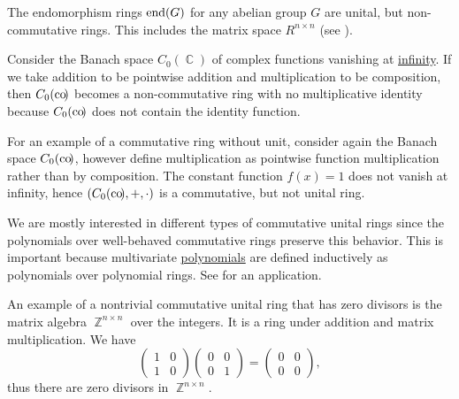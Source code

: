 \begin{example}
\begin{refenum}
     The endomorphism rings \( \operatorname{end}(G) \) for any abelian group \( G \) are unital, but non-commutative rings. This includes the matrix space \( R^{n \times n} \) (see ).

     Consider the Banach space \( C_0(\BbbC) \) of complex functions vanishing at \hyperref[def:function_spaces/c0]{infinity}. If we take addition to be pointwise addition and multiplication to be composition, then \( C_0(\operatorname*{co\negthinspace)} \) becomes a non-commutative ring with no multiplicative identity because \( C_0(\operatorname*{co\negthinspace)} \) does not contain the identity function.

     For an example of a commutative ring without unit, consider again the Banach space \( C_0(\operatorname*{co\negthinspace)} \), however define multiplication as pointwise function multiplication rather than by composition. The constant function \( f(x) = 1 \) does not vanish at infinity, hence \( (C_0(\operatorname*{co\negthinspace)}, +, \cdot) \) is a commutative, but not unital ring.

     We are mostly interested in different types of commutative unital rings since the polynomials over well-behaved commutative rings preserve this behavior. This is important because multivariate \hyperref[def:multivariate_polynomial]{polynomials} are defined inductively as polynomials over polynomial rings. See  for an application.

    An example of a nontrivial commutative unital ring that has zero divisors is the matrix algebra \( \BbbZ^{n \times n} \) over the integers. It is a ring under addition and matrix multiplication. We have
    \begin{equation*}
      \begin{pmatrix}
        1 & 0 \\
        1 & 0
      \end{pmatrix}
      \begin{pmatrix}
        0 & 0 \\
        0 & 1
      \end{pmatrix}
      =
      \begin{pmatrix}
        0 & 0 \\
        0 & 0
      \end{pmatrix},
    \end{equation*}
    thus there are zero divisors in \( \BbbZ^{n \times n} \).


\end{refenum}
\end{example}
